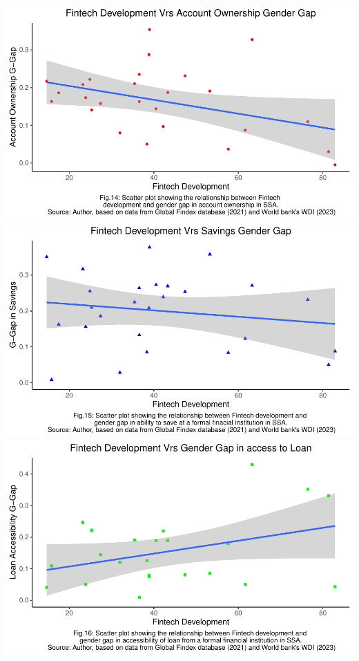 \documentclass[preprint, 3p,
authoryear]{elsarticle} %
\begin{document}
\bigskip

\includegraphics{504.Project1_files/figure-latex/unnamed-chunk-8-1.pdf}
\includegraphics{504.Project1_files/figure-latex/unnamed-chunk-8-2.pdf}
\includegraphics{504.Project1_files/figure-latex/unnamed-chunk-8-3.pdf}
\end{document}

